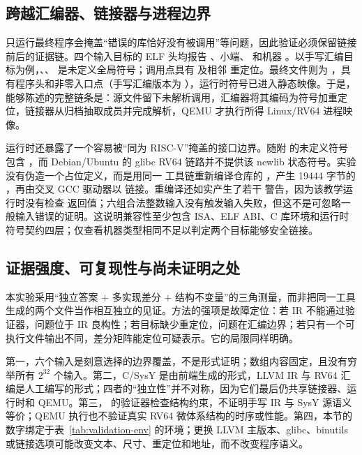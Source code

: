 \subsection{跨越汇编器、链接器与进程边界}

只运行最终程序会掩盖“错误的库恰好没有被调用”等问题，因此验证必须保留链接前后的证据链。\observed 四个输入目标的 ELF 头均报告 、小端、 和机器 。以手写汇编目标为例，、、 是未定义全局符号；调用点具有  及相邻  重定位。最终文件则为 ，具有程序头和非零入口点（手写汇编版本为 ），运行时符号已进入静态映像。于是，能够陈述的完整链条是：源文件留下未解析调用，汇编器将其编码为符号加重定位，链接器从归档抽取成员并完成解析，QEMU 才执行所得 Linux/RV64 进程映像。

运行时还暴露了一个容易被“同为 RISC-V”掩盖的接口边界。\observed 随附  的未定义符号包含 ，而 Debian/Ubuntu 的 glibc RV64 链路并不提供该 newlib 状态符号。实验没有伪造一个占位定义，而是用同一  工具链重新编译仓库的 ，产生 19444 字节的 ，再由交叉 GCC 驱动器以  链接。重编译还如实产生了若干  警告，因为该教学运行时没有检查  返回值；六组合法整数输入没有触发输入失败，但这不是可忽略一般输入错误的证明。\inferred 这说明兼容性至少包含 ISA、ELF ABI、C 库环境和运行时符号契约四层；仅查看机器类型相同不足以判定两个目标能够安全链接。

\subsection{证据强度、可复现性与尚未证明之处}

本实验采用“独立答案 $+$ 多实现差分 $+$ 结构不变量”的三角测量，而非把同一工具生成的两个文件当作相互独立的见证。方法的强项是故障定位：若 IR 不能通过验证器，问题位于 IR 良构性；若目标缺少重定位，问题在汇编边界；若只有一个可执行文件输出不同，差分矩阵能定位可疑表示。它的局限同样明确。

第一，六个输入是刻意选择的边界覆盖，不是形式证明；数组内容固定，且没有穷举所有 $2^{32}$ 个输入。第二，C/SysY 是由前端生成的形式，LLVM IR 与 RV64 汇编是人工编写的形式；四者的“独立性”并不对称，因为它们最后仍共享链接器、运行时和 QEMU。第三， 的验证器检查结构约束，不证明手写 IR 与 SysY 源语义等价；QEMU 执行也不验证真实 RV64 微体系结构的时序或性能。第四，本节的数字绑定于表~\ref{tab:validation-env} 的环境；更换 LLVM 主版本、glibc、binutils 或链接选项可能改变文本、尺寸、重定位和地址，而不改变程序语义。

